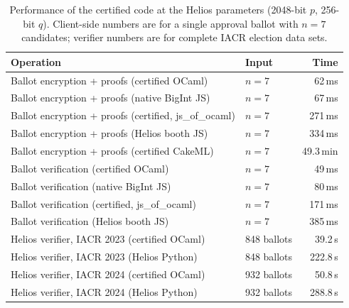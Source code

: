 \documentclass[sigconf,anonymous,review]{acmart}
\begin{document}
\begin{table}
  \caption{Performance of the certified code at the Helios parameters (2048-bit $p$, 256-bit $q$). Client-side numbers are for a single approval ballot with $n = 7$ candidates; verifier numbers are for complete IACR election data sets.}
  \label{tab:perf}
  \small
  \begin{tabular}{@{}llr@{}}
    \toprule
    Operation & Input & Time\\
    \midrule
    Ballot encryption + proofs (certified OCaml) & $n = 7$ & 62\,ms\\
    Ballot encryption + proofs (native BigInt JS) & $n = 7$ & 67\,ms\\
    Ballot encryption + proofs (certified, js\_of\_ocaml) & $n = 7$ & 271\,ms\\
    Ballot encryption + proofs (Helios booth JS) & $n = 7$ & 334\,ms\\
    Ballot encryption + proofs (certified CakeML) & $n = 7$ & 49.3\,min\\
    Ballot verification (certified OCaml) & $n = 7$ & 49\,ms\\
    Ballot verification (native BigInt JS) & $n = 7$ & 80\,ms\\
    Ballot verification (certified, js\_of\_ocaml) & $n = 7$ & 171\,ms\\
    Ballot verification (Helios booth JS) & $n = 7$ & 385\,ms\\
    Helios verifier, IACR 2023 (certified OCaml) & 848 ballots & 39.2\,s\\
    Helios verifier, IACR 2023 (Helios Python) & 848 ballots & 222.8\,s\\
    Helios verifier, IACR 2024 (certified OCaml) & 932 ballots & 50.8\,s\\
    Helios verifier, IACR 2024 (Helios Python) & 932 ballots & 288.8\,s\\
    \bottomrule
  \end{tabular}
\end{table}
\end{document}
